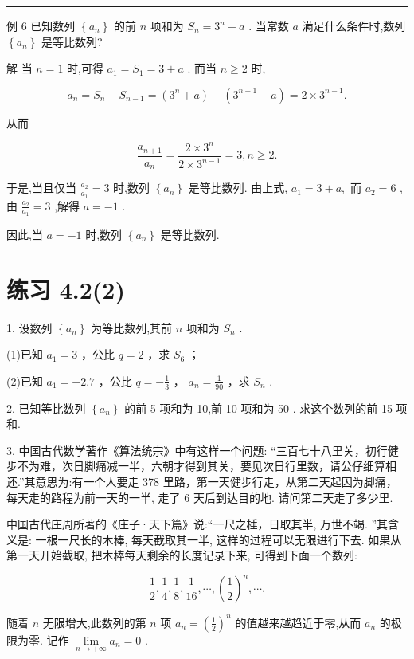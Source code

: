\documentclass[10pt]{article}
\newcommand{\HRule}{\begin{center}\rule{0.9\linewidth}{0.2mm}\end{center}}
\begin{document}
\HRule

例 6 已知数列 \(\left\{  {a}_{n}\right\}\) 的前 \(n\) 项和为 \({S}_{n} = {3}^{n} + a\) . 当常数 \(a\) 满足什么条件时,数列 \(\left\{  {a}_{n}\right\}\) 是等比数列?

解 当 \(n = 1\) 时,可得 \({a}_{1} = {S}_{1} = 3 + a\) . 而当 \(n \geq  2\) 时,

\[
{a}_{n} = {S}_{n} - {S}_{n - 1} = \left( {{3}^{n} + a}\right)  - \left( {{3}^{n - 1} + a}\right)  = 2 \times  {3}^{n - 1}.
\]

从而

\[
\frac{{a}_{n + 1}}{{a}_{n}} = \frac{2 \times  {3}^{n}}{2 \times  {3}^{n - 1}} = 3,n \geq  2.
\]

于是,当且仅当 \(\frac{{a}_{2}}{{a}_{1}} = 3\) 时,数列 \(\left\{  {a}_{n}\right\}\) 是等比数列. 由上式, \({a}_{1} = 3 + a,\) 而 \({a}_{2} = 6\) ,由 \(\frac{{a}_{2}}{{a}_{1}} = 3\) ,解得 \(a =  - 1\) .

因此,当 \(a =  - 1\) 时,数列 \(\left\{  {a}_{n}\right\}\) 是等比数列.

\section*{练习 4.2(2)}

1. 设数列 \(\left\{  {a}_{n}\right\}\) 为等比数列,其前 \(n\) 项和为 \({S}_{n}\) .

(1)已知 \({a}_{1} = 3\) ，公比 \(q = 2\) ，求 \({S}_{6}\) ；

(2)已知 \({a}_{1} =  - {2.7}\) ，公比 \(q =  - \frac{1}{3}\) ， \({a}_{n} = \frac{1}{90}\) ，求 \({S}_{n}\) .

2. 已知等比数列 \(\left\{  {a}_{n}\right\}\) 的前 5 项和为 10,前 10 项和为 50 . 求这个数列的前 15 项和.

3. 中国古代数学著作《算法统宗》中有这样一个问题: “三百七十八里关，初行健步不为难，次日脚痛减一半，六朝才得到其关，要见次日行里数，请公仔细算相还.”其意思为:有一个人要走 378 里路，第一天健步行走，从第二天起因为脚痛，每天走的路程为前一天的一半, 走了 6 天后到达目的地. 请问第二天走了多少里.

中国古代庄周所著的《庄子·天下篇》说:“一尺之棰，日取其半, 万世不竭. ”其含义是: 一根一尺长的木棒, 每天截取其一半, 这样的过程可以无限进行下去. 如果从第一天开始截取, 把木棒每天剩余的长度记录下来, 可得到下面一个数列:

\[
\frac{1}{2},\frac{1}{4},\frac{1}{8},\frac{1}{16},\cdots ,{\left( \frac{1}{2}\right) }^{n},\cdots .
\]

随着 \(n\) 无限增大,此数列的第 \(n\) 项 \({a}_{n} = {\left( \frac{1}{2}\right) }^{n}\) 的值越来越趋近于零,从而 \({a}_{n}\) 的极限为零. 记作 \(\mathop{\lim }\limits_{{n \rightarrow   + \infty }}{a}_{n} = 0\) .
\end{document}
